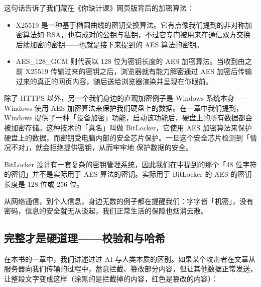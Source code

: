 这句话告诉了我们藏在《你缺计课》网页版背后的加密算法：

\begin{itemize}
  \item X25519 是一种基于椭圆曲线的密钥交换算法。它有点像我们提到的非对称加密算法如 RSA，也有成对的公钥与私钥，不过它专门被用来在通信双方交换后续加密的密钥——也就是接下来提到的 AES 算法的密钥。
  \item AES\_{}128\_{}GCM 则代表以 128 位为密钥长度的 AES 加密算法。当收到由之前 X25519 传输过来的密钥之后，浏览器就有能力解密通过 AES 加密后传输过来的真正的网页内容，随后送给浏览器渲染并呈现在你眼前。
\end{itemize}

除了 HTTPS 以外，另一个我们身边的直观加密例子是 Windows 系统本身——Windows 使用 AES 加密算法来保护我们硬盘上的数据。在一章中我们提到，Windows 提供了一种「设备加密」功能，启动该功能后，硬盘上的所有数据都会被加密存储。这种技术的「真名」叫做 BitLocker，它使用 AES 加密算法来保护硬盘上的数据，而密钥受电脑内部的安全芯片保护。一旦这个安全芯片检测到「情况不对」，就会拒绝提供密钥，从而牢牢地  保护数据的安全。

\begin{note}
  BitLocker 设计有一套复杂的密钥管理系统，因此我们在中提到的那个「48 位字符的密钥」并不是实际用于 AES 算法的密钥。实际用于 BitLocker 的 AES 的密钥长度是 128 位或 256 位。
\end{note}

从网络通信，到个人信息，身边无数的例子都在提醒我们：字字皆「机密」，没有密码，信息的安全就无从谈起，我们正常生活的保障也烟消云散。

\subsection{完整才是硬道理——校验和与哈希}

在本书的一章中，我们讲述过过 AI 与人类本质的区别。如果某个攻击者在文章从服务器向我们传输的过程中，蓄意拦截、篡改部分内容，但让其他数据正常发送，让整段文字变成这样（涂黑的是拦截掉的内容，红色是篡改的内容）：

